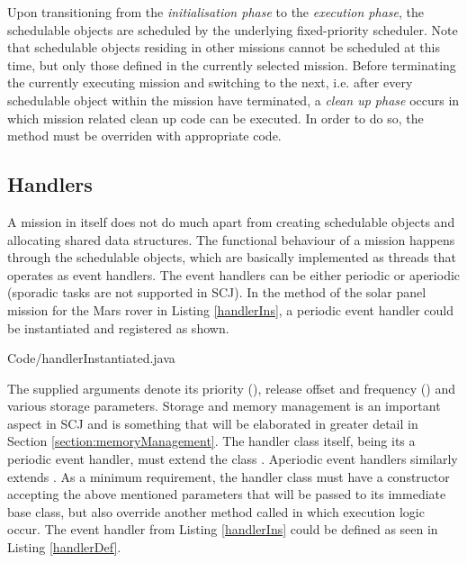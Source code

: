 Upon transitioning from the \textit{initialisation phase} to the \textit{execution phase}, the schedulable objects are scheduled by the underlying fixed-priority scheduler. Note that schedulable objects residing in other missions cannot be scheduled at this time, but only those defined in the currently selected mission. Before terminating the currently executing mission and switching to the next, i.e. after every schedulable object within the mission have terminated, a \textit{clean up phase} occurs in which mission related clean up code can be executed. In order to do so, the  method must be overriden with appropriate code.

\subsection{Handlers}
\label{subsection:handlers}
A mission in itself does not do much apart from creating schedulable objects and allocating shared data structures. The functional behaviour of a mission happens through the schedulable objects, which are basically implemented as threads that operates as event handlers. The event handlers can be either periodic or aperiodic (sporadic tasks are not supported in SCJ). In the  method of the solar panel mission for the Mars rover in Listing \ref{handlerIns}, a periodic event handler could be instantiated and registered as shown.


{Code/handlerInstantiated.java}

The supplied arguments denote its priority (), release offset and frequency () and various storage parameters. Storage and memory management is an important aspect in SCJ and is something that will be elaborated in greater detail in Section \ref{section:memoryManagement}. The handler class itself, being its a periodic event handler, must extend the class . Aperiodic event handlers similarly extends . As a minimum requirement, the handler class must have a constructor accepting the above mentioned parameters that will be passed to its immediate base class, but also override another method called  in which execution logic occur. The  event handler from Listing \ref{handlerIns} could be defined as seen in Listing \ref{handlerDef}.

